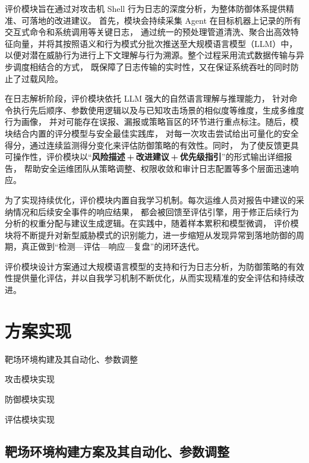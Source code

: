 \documentclass[lang=cn,10pt]{elegantbook}
\begin{document}
评价模块旨在通过对攻击机 Shell 行为日志的深度分析，为整体防御体系提供精准、可落地的改进建议。
首先，模块会持续采集 Agent 在目标机器上记录的所有交互式命令和系统调用等关键日志，
通过统一的预处理管道清洗、聚合出高效特征向量，并将其按照语义和行为模式分批次推送至大规模语言模型（LLM）中，
以便对潜在威胁行为进行上下文理解与行为溯源。整个过程采用流式数据传输与异步调度相结合的方式，
既保障了日志传输的实时性，又在保证系统吞吐的同时防止了过载风险。

在日志解析阶段，评价模块依托 LLM 强大的自然语言理解与推理能力，
针对命令执行先后顺序、参数使用逻辑以及与已知攻击场景的相似度等维度，生成多维度行为画像，
并对可能存在误报、漏报或策略盲区的环节进行重点标注。随后，模块结合内置的评分模型与安全最佳实践库，
对每一次攻击尝试给出可量化的安全得分，通过连续监测得分变化来评估防御策略的有效性。同时，
为了使反馈更具可操作性，评价模块以“\textbf{风险描述 + 改进建议 + 优先级指引}”的形式输出详细报告，
帮助安全运维团队从策略调整、权限收敛和审计日志配置等多个层面迅速响应。

为了实现持续优化，评价模块内置自我学习机制。每次运维人员对报告中建议的采纳情况和后续安全事件的响应结果，
都会被回馈至评估引擎，用于修正后续行为分析的权重分配与建议生成逻辑。在实践中，随着样本累积和模型微调，
评价模块将不断提升对新型威胁模式的识别能力，进一步缩短从发现异常到落地防御的周期，真正做到“检测—评估—响应—复盘”的闭环迭代。

\begin{definition}
评价模块设计方案通过大规模语言模型的支持和行为日志分析，为防御策略的有效性提供量化评估，并以自我学习机制不断优化，从而实现精准的安全评估和持续改进。
\end{definition}




\chapter{方案实现}
\begin{introduction}
  \item 靶场环境构建及其自动化、参数调整
  \item 攻击模块实现
  \item 防御模块实现
  \item 评估模块实现
\end{introduction}

\section{靶场环境构建方案及其自动化、参数调整}
\end{document}
